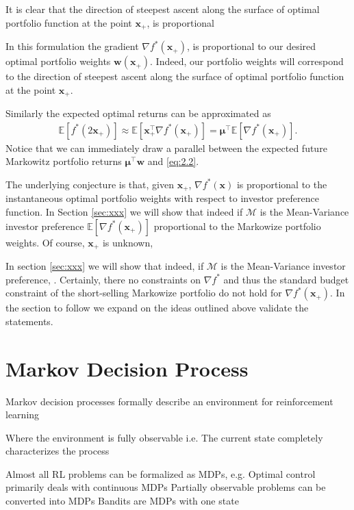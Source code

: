\documentclass[]{usiinfdocprop}
\newcommand{\E}[1]{\mathbb{E} \left[#1 \right]}
\newcommand{\bb}[1]{\boldsymbol{\mathbf{#1}}}
\begin{document}
It is clear that the direction of steepest ascent along the surface of optimal portfolio function at the point $\bb{x}_+$, is proportional  

In this formulation the gradient $\nabla f^*(\bb{x}_+)$, is proportional to our desired optimal portfolio weights $\bb{w}(\bb{x}_+)$. Indeed, our portfolio weights will correspond to the direction of steepest ascent along the surface of optimal portfolio function at the point $\bb{x}_+$.

Similarly the expected optimal returns can be approximated as
\begin{align}
    \mathbb{E}[f^*(2\bb{x}_+)] \approx \mathbb{E}[ \bb{x}_+^\top \nabla f^*(\bb{x}_+)] =  \bb{\mu}^\top \mathbb{E}[\nabla f^*(\bb{x}_+)]. 
\end{align}
Notice that we can immediately draw a parallel between the expected future Markowitz portfolio returns $\bb{\mu}^\top \bb{w} $ and \eqref{eq:2.2}. 

The underlying conjecture is that, given $\bb{x}_+$, $\nabla f^*(\bb{x})$ is proportional to the instantaneous optimal portfolio weights with respect to investor preference function. In Section \ref{sec:xxx} we will show that indeed if $\mathcal{M}$ is the Mean-Variance investor preference $\E{\nabla f^*(\bb{x}_+)}$ proportional to the Markowize portfolio weights. Of course, $\bb{x}_+$ is unknown, 


In section \ref{sec:xxx} we will show that indeed, if $\mathcal{M}$ is the Mean-Variance investor preference, . Certainly, there no constraints on $\nabla f^*$ and thus the standard budget constraint of the short-selling Markowize portfolio do not hold for $\nabla f^*(\bb{x}_+)$. In the section to follow we expand on the ideas outlined above validate the statements.


\newpage


\section{Markov Decision Process}



Markov decision processes formally describe an environment
for reinforcement learning

Where the environment is fully observable i.e. The current state completely characterizes the process

Almost all RL problems can be formalized as MDPs, e.g. Optimal control primarily deals with continuous MDPs Partially observable problems can be converted into MDPs Bandits are MDPs with one state
\end{document}
